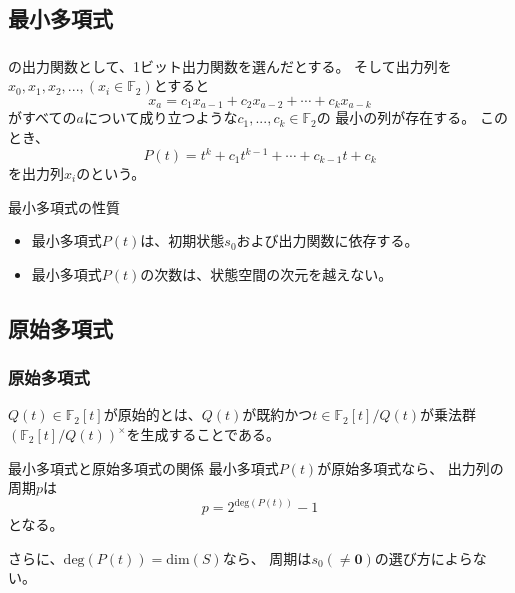\documentclass[cjk, dvips, handout, trans, xcolor=dvipsnames, hyperref={bookmarks=false}]{beamer}
\def\F2{{\mathbb F}_2}
\begin{document}
\subsection{最小多項式}
\begin{frame}[t]
  \frametitle{\insertsubsection}
  \FLPRNG の出力関数として、1ビット出力関数を選んだとする。
  そして出力列を$x_0, x_1, x_2, ..., (x_i \in \F2)$とすると
  \[
  x_a = c_1x_{a-1} + c_{2}x_{a-2} + \cdots + c_{k}x_{a-k}
  \]
  がすべての$a$について成り立つような$c_1,...,c_k \in \F2$の
  最小の列が存在する。
  このとき、
  \[
  P(t) = t^k + c_1t^{k-1} + \cdots + c_{k-1}t + c_{k}
  \]
  を出力列$x_i$のという。

  \pause
  \begin{block}{最小多項式の性質}
    \begin{itemize}
    \item 最小多項式$P(t)$は、初期状態$s_0$および出力関数に依存する。
    \item 最小多項式$P(t)$の次数は、状態空間の次元を越えない。
    \end{itemize}
  \end{block}

\end{frame}

\subsection{原始多項式}
\begin{frame}[t]
  \frametitle{原始多項式}

  $Q(t) \in \F2[t]$が原始的とは、$Q(t)$が既約かつ$t \in \F2[t]/Q(t)$が乗法群
  $(\F2[t]/Q(t))^{\times}$を生成することである。

  \pause
  \begin{block}{最小多項式と原始多項式の関係}
    最小多項式$P(t)$が原始多項式なら、
    出力列の周期$p$は
    \[
    p = 2^{\mathrm{deg}(P(t))}-1
    \]
    となる。

    さらに、$\mathrm{deg}(P(t)) = \mathrm{dim}(S)$なら、
    周期は$s_0 (\neq \mathbf{0})$の選び方によらない。
  \end{block}
\end{frame}
\end{document}
